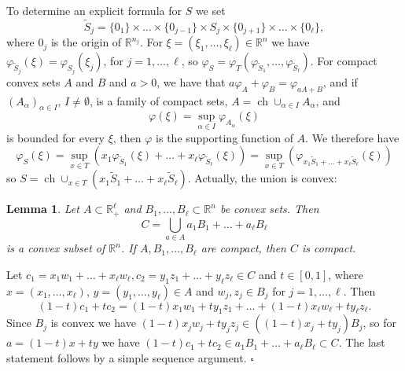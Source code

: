 \documentclass[a4paper,12pt,leqno,english]{article}
\numberwithin{equation}{section}
\newtheorem{lemma+}  [theorem+]  {Lemma}
\newenvironment{lemma}{\begin{lemma+}\sl}{\end{lemma+}\rm}
\newenvironment{proof}{\medbreak\noindent{\bf  Proof:}\rm}{\hfill$\square$\rm}
\begin{document}
To determine an explicit formula for $S$ we set
\begin{equation*}
    \widetilde{S}_j
    =
    \{0_1\} \times \dots \times \{0_{j - 1}\} \times S_j \times \{0_{j + 1}\} \times \dots \times \{0_\ell\},
\end{equation*}
where $0_j$ is the origin of $\mathbb{R}^{n_j}$.
For $\xi = (\xi_1, \dots, \xi_\ell) \in \mathbb{R}^n$ we have $\varphi_{\widetilde{S}_j}(\xi) = \varphi_{S_j}(\xi_j)$, for $j = 1, \dots, \ell$, so
$
    \varphi_S
    =
    \varphi_T(\varphi_{\widetilde{S}_1}, \dots, \varphi_{\widetilde{S}_\ell}).
    $
For compact convex sets $A$ and $B$ and $a > 0$, we have that $a\varphi_A + \varphi_B = \varphi_{aA + B}$, and
    if $(A_\alpha)_{\alpha \in I}$, $I \neq \emptyset$, is a family of compact sets, $A = \operatorname{ch} \cup_{\alpha \in I} A_\alpha$, and
\begin{equation*}
    \varphi(\xi)
    =
    \sup_{\alpha \in I}
        \varphi_{A_\alpha}(\xi)
\end{equation*}
is bounded for every $\xi$, then $\varphi$ is the supporting function of $A$.
We therefore have
\begin{equation*}
    \varphi_S(\xi)
    =
    \sup_{x \in T}
    (
        x_1 \varphi_{\widetilde{S}_1}(\xi)
        + \dots +
        x_\ell \varphi_{\widetilde{S}_\ell}(\xi)
    )
    =
    \sup_{x \in T}
    (
        \varphi_{x_1 \widetilde{S}_1 + \dots + x_\ell \widetilde{S}_\ell}(\xi)
    )
\end{equation*}
so $S = \operatorname{ch}\cup_{x \in T} (x_1 \widetilde{S}_1 + \dots + x_\ell \widetilde{S}_\ell)$.
Actually, the union is convex:

\begin{lemma}
Let $A\subset \mathbb{R}^\ell_+$ and $B_1,\dots,B_\ell\subset \mathbb{R}^n$ be convex sets.
Then
\begin{equation*}
    C
    =
    \bigcup_{a \in A} a_1 B_1 + \dots + a_\ell B_\ell
\end{equation*}
is a convex subset of $\mathbb{R}^n$.
If $A, B_1, \dots, B_\ell$ are compact, then $C$ is compact.
\end{lemma}

\begin{proof}  Let $c_1 = x_1 w_1 + \dots + x_\ell w_\ell,
  c_2 = y_1 z_1 + \dots + y_\ell z_\ell \in C$ and $t \in [0,1]$,
where $x = (x_1, \dots, x_\ell)$, $y = (y_1, \dots, y_\ell) \in A$ and $w_j, z_j \in B_j$
for $j = 1, \dots, \ell$.
Then
\begin{equation*}
    (1 - t)c_1 + tc_2
    =
    (1 - t)x_1 w_1 + ty_1 z_1 + \dots + (1 - t)x_\ell w_\ell + ty_\ell z_\ell.
\end{equation*}
Since $B_j$ is convex we have $(1 - t)x_j w_j + ty_j z_j \in ((1 - t)x_j + ty_j)B_j$, so for $a = (1 - t)x + ty$ we have
$(1 - t)c_1 + tc_2 \in a_1B_1 + \dots + a_\ell B_\ell \subset  C$.
The last statement follows by a simple sequence argument.
\end{proof}
\end{document}
